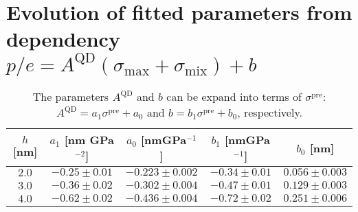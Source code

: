 \clearpage
\section*{Evolution of fitted parameters from dependency $p/e = A^\mathrm{QD} \left(\sigma_\mathrm{max}+\sigma_\mathrm{mix}\right) + b$}
%
\label{app:empirical_model}

 		
 		\begin{table}[ht!]
 			\centering
 			\caption{The parameters $A^\mathrm{QD}$ and $b$ can be expand into terms of $\sigma^\mathrm{pre}$: $A^\mathrm{QD}=a_1\sigma^\mathrm{pre}+a_0$ and $b=b_1\sigma^\mathrm{pre}+b_0$, respectively.}
 			\label{tab:prestress_fit}
 			\begin{tabular}{|c|c|c||c|c|}
 				\hline
 				$h$ [nm]		   & $a_1$   [nm GPa$^{-2}$]  &$a_0$ [nmGPa$^{-1}$] & $b_1$ [nmGPa$^{-1}$] & $b_0$ [nm] \\ \hline
 			$2.0$   & $-0.25 \pm 0.01$  &  $-0.223 \pm 0.002$ & $-0.34 \pm 0.01$ & $0.056\pm0.003$ \\ \hline %
 			$3.0$   & $-0.36 \pm 0.02$  &  $-0.302 \pm 0.004$ & $-0.47 \pm 0.01$ & $0.129\pm0.003$ \\ \hline %
 			$4.0$   & $-0.62 \pm 0.02$  &  $-0.436 \pm 0.004$ & $-0.72 \pm 0.02$ & $0.251\pm0.006$ \\ \hline %
 			\end{tabular}    
 		\end{table}
 		
 		
 		

